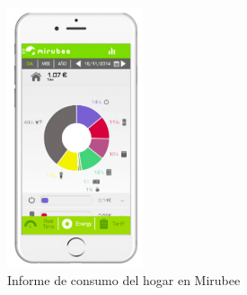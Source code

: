 \begin{itemize}
  \begin{figure}[!h]
	\centering
	\includegraphics[width=4cm]{figs/mirubee.png}
	\caption{Informe de consumo del hogar en Mirubee}
        \label{fig:mirubee}
\end{figure}
\end{itemize}

